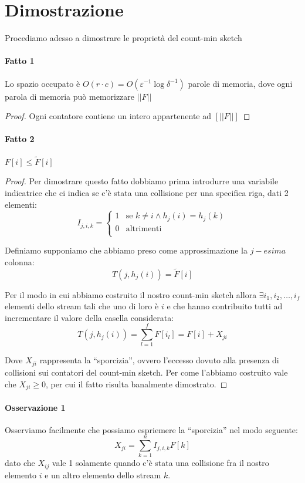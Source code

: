 \documentclass[a4paper,11pt]{book}
\begin{document}
\section{Dimostrazione}

Procediamo adesso a dimostrare le propriet\`a del count-min sketch

\paragraph{Fatto 1} Lo spazio occupato \`e $O(r \cdot c) = O(\varepsilon^{-1} \log \delta^{-1})$ parole di memoria, dove ogni parola di memoria pu\`o memorizzare $||F||$

\begin{proof}
Ogni contatore contiene un intero appartenente ad $\left[||F||\right]$
\end{proof}

\paragraph{Fatto 2} $F[i] \leq \tilde{F}[i]$

\begin{proof}
Per dimostrare questo fatto dobbiamo prima introdurre una variabile indicatrice che ci indica se c'\`e stata una collisione per una specifica riga, dati 2 elementi:$$ I_{j,i,k} = \begin{cases} 1 & \mbox{se } k \neq i \wedge h_j (i) = h_j (k) \\ 0 & \mbox{altrimenti} \\ \end{cases} $$

Definiamo supponiamo che abbiamo preso come approssimazione la $j-esima$ colonna: $$T(j, h_j (i)) = \tilde{F}[i]$$

Per il modo in cui abbiamo costruito il nostro count-min sketch allora $\exists i_1, i_2, \ldots, i_f $ elementi dello stream tali che uno di loro \`e $i$ e che hanno contribuito tutti ad incrementare il valore della casella considerata: $$T(j, h_j (i)) = \sum_{l = 1}^{f} F[i_l] = F[i] + X_{ji}$$

Dove $X_{ji}$ rappresenta la ``sporcizia'', ovvero l'eccesso dovuto alla presenza di collisioni sui contatori del count-min sketch. Per come l'abbiamo costruito vale che $X_{ji} \geq 0$, per cui il fatto risulta banalmente dimostrato.

\end{proof}


\paragraph{Osservazione 1} Osserviamo facilmente che possiamo espriemere la ``sporcizia'' nel modo seguente: $$X_{ji} = \sum_{k=1}^{n} I_{j,i,k} F[k]$$ dato che $X_{ij}$ vale 1 solamente quando c'\`e stata una collisione fra il nostro elemento $i$ e un altro elemento dello stream $k$.
\end{document}
